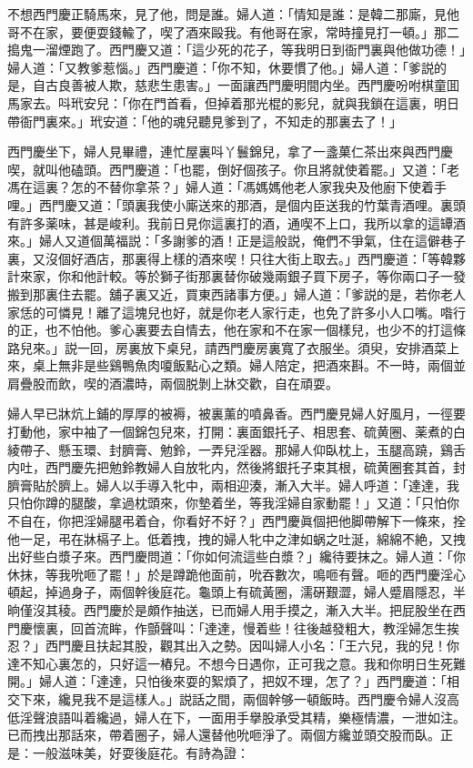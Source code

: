 不想西門慶正騎馬來，見了他，問是誰。婦人道：「情知是誰：是韓二那廝，見他哥不在家，要便耍錢輸了，喫了酒來毆我。有他哥在家，常時撞見打一頓。」那二搗鬼一溜煙跑了。西門慶又道：「這少死的花子，等我明日到衙門裏與他做功德！」婦人道：「又教爹惹惱。」西門慶道：「你不知，休要慣了他。」婦人道：「爹説的是，自古良善被人欺，慈悲生患害。」一面讓西門慶明間内坐。西門慶吩咐棋童囬馬家去。呌玳安兒：「你在門首看，但掉着那光棍的影兒，就與我鎖在這裏，明日帶衙門裏來。」玳安道：「他的魂兒聽見爹到了，不知走的那裏去了！」

西門慶坐下，婦人見畢禮，連忙屋裏呌丫鬟錦兒，拿了一盞菓仁茶出來與西門慶喫，就叫他磕頭。西門慶道：「也罷，倒好個孩子。你且將就使着罷。」又道：「老馮在這裏？怎的不替你拿茶？」婦人道：「馮媽媽他老人家我央及他廚下使着手哩。」西門慶又道：「頭裏我使小廝送來的那酒，是個内臣送我的竹葉青酒哩。裏頭有許多薬味，甚是峻利。我前日見你這裏打的酒，通喫不上口，我所以拿的這罈酒來。」婦人又道個萬福説：「多謝爹的酒！正是這般説，俺們不爭氣，住在這僻巷子裏，又沒個好酒店，那裏得上樣的酒來喫！只往大街上取去。」西門慶道：「等韓夥計來家，你和他計較。等於獅子街那裏替你破幾兩銀子買下房子，等你兩口子一發搬到那裏住去罷。舖子裏又近，買東西諸事方便。」婦人道：「爹説的是，若你老人家恁的可憐見！離了這塊兒也好，就是你老人家行走，也免了許多小人口嘴。喒行的正，也不怕他。爹心裏要去自情去，他在家和不在家一個樣兒，也少不的打這條路兒來。」説一回，房裏放下桌兒，請西門慶房裏寬了衣服坐。須臾，安排酒菜上來，桌上無非是些鷄鴨魚肉嗄飯點心之類。婦人陪定，把酒來斟。不一時，兩個並肩疊股而飲，喫的酒濃時，兩個脱剝上牀交歡，自在頑耍。

婦人早已牀炕上鋪的厚厚的被褥，被裏薰的噴鼻香。西門慶見婦人好風月，一徑要打動他，家中袖了一個錦包兒來，打開：裏面銀托子、相思套、硫黄圈、薬煮的白綾帶子、懸玉環、封臍膏、勉鈴，一弄兒淫器。那婦人仰臥枕上，玉腿高蹺，鷄舌内吐，西門慶先把勉鈴教婦人自放牝内，然後將銀托子束其根，硫黄圈套其首，封臍膏貼於臍上。婦人以手導入牝中，兩相迎湊，漸入大半。婦人呼道：「達達，我只怕你蹲的腿酸，拿過枕頭來，你墊着坐，等我淫婦自家動罷！」又道：「只怕你不自在，你把淫婦腿弔着㒲，你看好不好？」西門慶眞個把他脚帶解下一條來，拴他一足，弔在牀槅子上。低着拽，拽的婦人牝中之津如蜗之吐涎，綿綿不絶，又拽出好些白漿子來。西門慶問道：「你如何流這些白漿？」纔待要抹之。婦人道：「你休抹，等我吮咂了罷！」於是蹲跪他面前，吮吞數次，鳴咂有聲。咂的西門慶淫心頓起，掉過身子，兩個幹後庭花。龜頭上有硫黃圈，濡硏艱澀，婦人蹙眉隱忍，半晌僅沒其稜。西門慶於是頗作抽送，已而婦人用手摸之，漸入大半。把屁股坐在西門慶懷裏，回首流眸，作顫聲叫：「達達，慢着些！往後越發粗大，教淫婦怎生挨忍？」西門慶且扶起其股，觀其出入之勢。因叫婦人小名：「王六兒，我的兒！你達不知心裏怎的，只好這一樁兒。不想今日遇你，正可我之意。我和你明日生死難開。」婦人道：「達達，只怕後來耍的絮煩了，把奴不理，怎了？」西門慶道：「相交下來，纔見我不是這樣人。」説話之間，兩個幹够一頓飯時。西門慶令婦人沒高低淫聲浪語叫着纔過，婦人在下，一面用手擧股承受其精，樂極情濃，一泄如注。已而拽出那話來，帶着圈子，婦人還替他吮咂淨了。兩個方纔並頭交股而臥。正是：一般滋味美，好耍後庭花。有詩為證：


